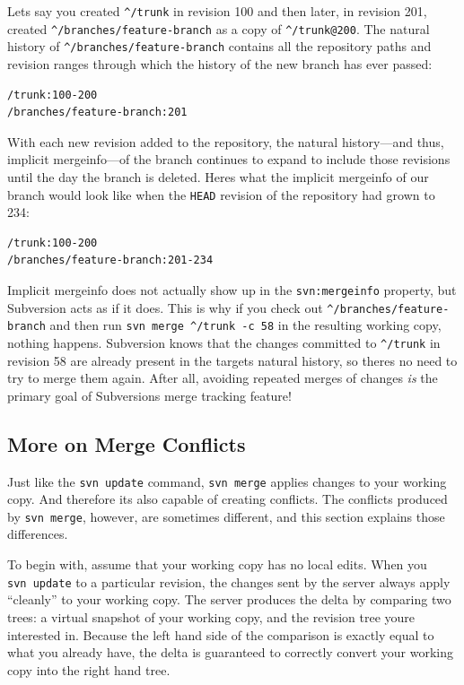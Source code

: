 Let\textquotesingle s say you created \texttt{\^{}/trunk} in revision
100 and then later, in revision 201, created
\texttt{\^{}/branches/feature-branch} as a copy of
\texttt{\^{}/trunk@200}. The natural history of
\texttt{\^{}/branches/feature-branch} contains all the repository paths
and revision ranges through which the history of the new branch has ever
passed:

\begin{verbatim}
/trunk:100-200
/branches/feature-branch:201
\end{verbatim}

With each new revision added to the repository, the natural
history---and thus, implicit mergeinfo---of the branch continues to
expand to include those revisions until the day the branch is deleted.
Here\textquotesingle s what the implicit mergeinfo of our branch would
look like when the \texttt{HEAD} revision of the repository had grown to
234:

\begin{verbatim}
/trunk:100-200
/branches/feature-branch:201-234
\end{verbatim}

Implicit mergeinfo does not actually show up in the
\texttt{svn:mergeinfo} property, but Subversion acts as if it does. This
is why if you check out \texttt{\^{}/branches/feature-branch} and then
run \texttt{svn\ merge\ \^{}/trunk\ -c\ 58} in the resulting working
copy, nothing happens. Subversion knows that the changes committed to
\texttt{\^{}/trunk} in revision 58 are already present in the
target\textquotesingle s natural history, so there\textquotesingle s no
need to try to merge them again. After all, avoiding repeated merges of
changes \emph{is} the primary goal of Subversion\textquotesingle s merge
tracking feature!

\subsection{More on Merge
Conflicts}\label{svn.branchmerge.advanced.mergeconflicts}

Just like the \texttt{svn\ update} command, \texttt{svn\ merge} applies
changes to your working copy. And therefore it\textquotesingle s also
capable of creating conflicts. The conflicts produced by
\texttt{svn\ merge}, however, are sometimes different, and this section
explains those differences.

To begin with, assume that your working copy has no local edits. When
you \texttt{svn\ update} to a particular revision, the changes sent by
the server always apply ``cleanly'' to your working copy. The server
produces the delta by comparing two trees: a virtual snapshot of your
working copy, and the revision tree you\textquotesingle re interested
in. Because the left hand side of the comparison is exactly equal to
what you already have, the delta is guaranteed to correctly convert your
working copy into the right hand tree.

